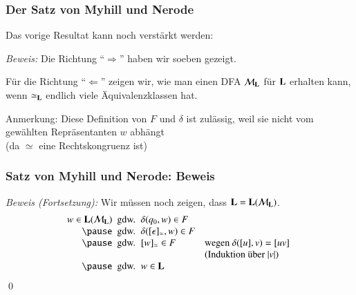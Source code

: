 \documentclass[aspectratio=1610,onlymath]{beamer}
\begin{document}
\begin{frame}\frametitle{Der Satz von Myhill und Nerode}

Das vorige Resultat kann noch verstärkt werden:

\pause

\emph{Beweis:}
Die Richtung "`$\Rightarrow$"' haben wir soeben gezeigt.\pause\medskip

Für die Richtung "`$\Leftarrow$"' zeigen wir, wie man einen DFA $\mathcal{M}_{\textbf{\textcolor{black}{L}}}$ für $\textbf{\textcolor{black}{L}}$ erhalten kann, wenn $\simeq_{\textbf{\textcolor{black}{L}}}$ endlich viele Äquivalenzklassen hat.\pause

\vspace{-1ex}
{\tiny Anmerkung: Diese Definition von $F$ und $\delta$ ist zulässig, weil sie nicht vom gewählten Repräsentanten $w$ abhängt}\\[-1.5ex]{\tiny (da $\simeq$ eine Rechtskongruenz ist)}

\end{frame}


\begin{frame}\frametitle{Satz von Myhill und Nerode: Beweis}

\emph{Beweis (Fortsetzung):} Wir müssen noch zeigen, dass $\textbf{\textcolor{black}{L}}=\textbf{\textcolor{black}{L}}(\mathcal{M}_{\textbf{\textcolor{black}{L}}})$.
%
\[\begin{array}{r@{~\text{ gdw. }~}ll}
w\in\Slang{L}(\Smach{M}_{\Slang{L}}) & \delta(q_0,w)\in F \\\pause
	& \delta([\epsilon]_\simeq,w)\in F \\\pause
	& [w]_\simeq\in F & \text{wegen $\delta([u],v)=[uv]$ }\\
	\multicolumn{2}{c}{} & \text{(Induktion über $|v|$) }\\\pause
	& w\in \Slang{L}
\end{array}
\]
\qed

\end{frame}
\end{document}
